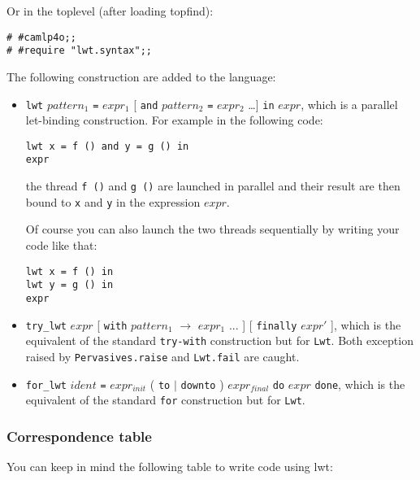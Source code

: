 \documentclass{article}
\newcommand{\lwt}{\texttt{Lwt}\xspace}
\begin{document}
Or in the toplevel (after loading topfind):

\begin{verbatim}
# #camlp4o;;
# #require "lwt.syntax";;
\end{verbatim}

The following construction are added to the language:

\begin{itemize}
\item \texttt{lwt} $pattern_1$ \texttt{=} $expr_1$ [ \texttt{and}
  $pattern_2$ \texttt{=} $expr_2$ \dots ] \texttt{in} $expr$, which is a
  parallel let-binding construction. For example in the following
  code:

\begin{verbatim}
lwt x = f () and y = g () in
expr
\end{verbatim}

  the thread \texttt{f ()} and \texttt{g ()} are launched in parallel
  and their result are then bound to \texttt{x} and \texttt{y} in the
  expression $expr$.

  Of course you can also launch the two threads sequentially by
  writing your code like that:

\begin{verbatim}
lwt x = f () in
lwt y = g () in
expr
\end{verbatim}

\item \texttt{try\_lwt} $expr$ [ \texttt{with} $pattern_1$
  \texttt{$\rightarrow$} $expr_1$ ... ] [ \texttt{finally} $expr'$ ],
  which is the equivalent of the standard \texttt{try-with}
  construction but for \lwt. Both exception raised by
  \texttt{Pervasives.raise} and \texttt{Lwt.fail} are caught.

\item \texttt{for\_lwt} $ident$ \texttt{=} $expr_{init}$ ( \texttt{to}
  $\mid$ \texttt{downto} ) $expr_{final}$ \texttt{do} $expr$
  \texttt{done}, which is the equivalent of the standard \texttt{for}
  construction but for \lwt.
\end{itemize}

\subsubsection{Correspondence table}

You can keep in mind the following table to write code using lwt:
\end{document}
